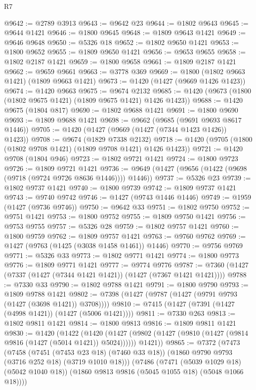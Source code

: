 \begin{lexlean}{R7}
\begin{coremodule}
@9642 := @2789 @3913
@9643 := @9642 @23
@9644 := @1802 @9643
@9645 := @9644 @1421
@9646 := @1800 @9645
@9648 := @1809 @9643 @1421
@9649 := @9646 @9648
@9650 := @5326 @18
@9652 := @1802 @9650 @1421
@9653 := @1800 @9652
@9655 := @1809 @9650 @1421
@9656 := @9653 @9655
@9658 := @1802 @2187 @1421
@9659 := @1800 @9658
@9661 := @1809 @2187 @1421
@9662 := @9659 @9661
@9663 := @3778 @369
@9669 := @1800 (@1802 @9663 @1421) (@1809 @9663 @1421)
@9673 := @1420 (@1427 (@9669 @1426 @1423))
@9674 := @1420 @9663
@9675 := @9674 @2132
@9685 := @1420 (@9673 (@1800 (@1802 @9675 @1421) (@1809 @9675 @1421) @1426 @1423))
@9688 := @1420 @9675 (@1804 @817)
@9690 := @1802 @9688 @1421
@9691 := @1800 @9690
@9693 := @1809 @9688 @1421
@9698 := @9662 (@9685 (@9691 @9693 @8617 @1446))
@9705 := @1420 (@1427 (@9669 (@1427 (@7344 @1423 @1426)) @1423))
@9708 := @9674 (@1829 @7338 @2132)
@9718 := @1420 (@9705 (@1800 (@1802 @9708 @1421) (@1809 @9708 @1421) @1426 @1423))
@9721 := @1420 @9708 (@1804 @946)
@9723 := @1802 @9721 @1421
@9724 := @1800 @9723
@9726 := @1809 @9721 @1421
@9736 := @9649 (@1427 (@9656 (@1422 (@9698 (@9718 (@9724 @9726 @8636 @1446)))) @1446))
@9737 := @5326 @23
@9739 := @1802 @9737 @1421
@9740 := @1800 @9739
@9742 := @1809 @9737 @1421
@9743 := @9740 @9742
@9746 := @1427 (@9743 @1446 @1446)
@9749 := @1959 (@1427 (@9736 @9746))
@9750 := @9642 @33
@9751 := @1802 @9750
@9752 := @9751 @1421
@9753 := @1800 @9752
@9755 := @1809 @9750 @1421
@9756 := @9753 @9755
@9757 := @5326 @28
@9759 := @1802 @9757 @1421
@9760 := @1800 @9759
@9762 := @1809 @9757 @1421
@9763 := @9760 @9762
@9769 := @1427 (@9763 (@1425 (@3038 @1458 @1461)) @1446)
@9770 := @9756 @9769
@9771 := @5326 @33
@9773 := @1802 @9771 @1421
@9774 := @1800 @9773
@9776 := @1809 @9771 @1421
@9777 := @9774 @9776
@9787 := @7360 (@1427 (@7337 (@1427 (@7344 @1421 @1421)) (@1427 (@7367 @1421 @1421))))
@9788 := @7330 @33
@9790 := @1802 @9788 @1421
@9791 := @1800 @9790
@9793 := @1809 @9788 @1421
@9802 := @7398 (@1427 (@9787 (@1427 (@9791 @9793 (@1427 (@3698 @1421)) @3708))))
@9810 := @7415 (@1427 (@7391 (@1427 (@4998 @1421)) (@1427 (@5006 @1421))))
@9811 := @7330 @263
@9813 := @1802 @9811 @1421
@9814 := @1800 @9813
@9816 := @1809 @9811 @1421
@9830 := @1420
    (@1422
      (@1420
        (@1427 (@9802 (@1427 (@9810 (@1427 (@9814 @9816 (@1427 (@5014 @1421)) @5024))))))
        @1421))
@9865 := @7372
    (@7473
      (@7458
        (@7451 (@7453 @23 @18) (@7460 @33 @18))
        (@1860 @9790 @9793 (@3716 @252 @18) (@3719 @1010 @18)))
      (@7486
        (@7471 (@5039 @1029 @18) (@5042 @1040 @18))
        (@1860 @9813 @9816 (@5045 @1055 @18) (@5048 @1066 @18))))

\end{coremodule}
\end{lexlean}
